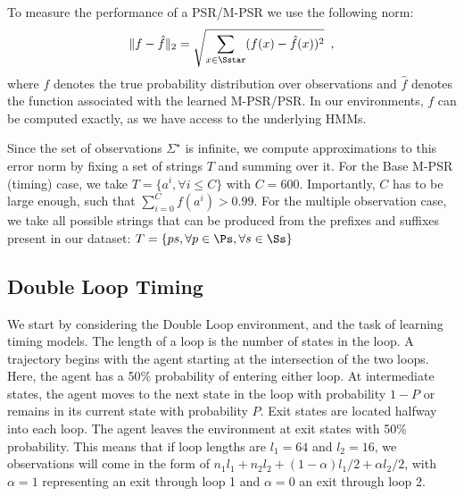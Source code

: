 

To measure the performance of a PSR/M-PSR we use the following norm:
\begin{equation*}
\|f - \hat{f}\|_2 = \sqrt{\sum_{x \in \Sstar}(f(x) - \hat{f}(x))^2} \enspace,
\end{equation*}
where $f$ denotes the true probability distribution over observations and $\hat{f}$ denotes the function associated with the learned M-PSR/PSR. In our environments, $f$ can be computed exactly, as we have access to the underlying HMMs.

Since the set of observations $\Sigma^{\star}$ is infinite, we compute approximations to this error norm by fixing a set of strings $T$ and summing over it. For the Base M-PSR (timing) case, we take $T = \{a^i, \forall i \leq C\}$ with $C=600$. Importantly, $C$ has to be  large enough, such that $\sum_{i=0}^{C} f(a^i)>0.99$. For the multiple observation case, we take all possible strings that can be produced from the prefixes and suffixes present in our dataset: $T = \{ps, \forall p \in \Ps, \forall s \in \Ss\} $


\subsection{Double Loop Timing}

We start by considering the Double Loop environment, and the task of learning timing models. The length of a loop is the number of states in the loop. A trajectory begins with the agent starting at the intersection of the two loops. Here, the agent has a 50\% probability of entering either loop. At intermediate states, the agent moves to the next state in the loop with probability $1-P$ or remains in its current state with probability $P$. Exit states are located halfway into each loop. The agent leaves the environment at exit states with 50\% probability. This means that if loop lengths are $l_1=64$ and $l_2=16$, we observations will come in the form of $n_1 l_1 + n_2 l_2 + (1-\alpha) l_1 / 2 + \alpha l_2 / 2$, with $\alpha=1$ representing an exit through loop 1 and $\alpha=0$ an exit through loop 2.

